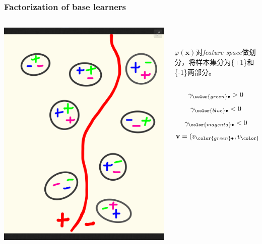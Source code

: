 \documentclass{beamer}
\begin{document}
\begin{frame}
\frametitle{Factorization of base learners}
\begin{columns}[T]
  \begin{column}{.55\textwidth}
    \includegraphics[width=\textwidth]{img/gbc_2.png}
  \end{column}
  \begin{column}{.45\textwidth}
    \ \\ \ \\
    $\varphi(\mathbf{x})$对\textit{feature space}做划分，将样本集分为\{+1\}和\{-1\}两部分。\\ \ \\
    $$\gamma_{\color{green} \bullet} > 0$$
    $$\gamma_{\color{blue} \bullet} < 0$$
    $$\gamma_{\color{magenta} \bullet} < 0$$
    $$\mathbf{v} = (v_{{\color{green} \bullet}}, v_{{\color{blue} \bullet}}, v_{{\color{magenta} \bullet}}) = (?,?,?)$$
  \end{column}
\end{columns}
\end{frame}
\end{document}
